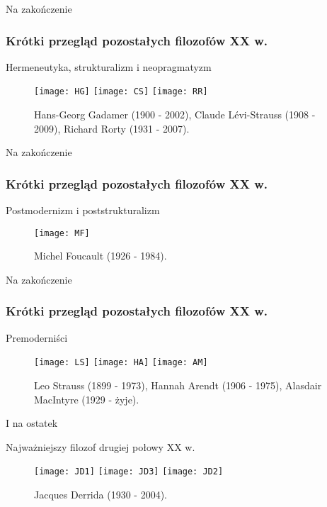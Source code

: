 \begin{frame}{Na zakończenie}
\frametitle{Krótki przegląd pozostałych filozofów XX w.}
\begin{block}{Hermeneutyka, strukturalizm i neopragmatyzm}
\begin{figure}
\centering
\texttt{[image: HG]}
\texttt{[image: CS]}
\texttt{[image: RR]}
\caption{Hans-Georg Gadamer (1900 - 2002), Claude Lévi-Strauss (1908 - 2009), Richard Rorty (1931 - 2007).}
\end{figure}
\end{block}
\end{frame}

\begin{frame}{Na zakończenie}
\frametitle{Krótki przegląd pozostałych filozofów XX w.}
\begin{block}{Postmodernizm i poststrukturalizm}
\begin{figure}
\centering
\texttt{[image: MF]}
\caption{Michel Foucault (1926 - 1984).}
\end{figure}
\end{block}
\end{frame}

\begin{frame}{Na zakończenie}
\frametitle{Krótki przegląd pozostałych filozofów XX w.}
\begin{block}{Premoderniści}
\begin{figure}
\centering
\texttt{[image: LS]}
\texttt{[image: HA]}
\texttt{[image: AM]}
\caption{Leo Strauss (1899 - 1973), Hannah Arendt (1906 - 1975), Alasdair MacIntyre (1929 - żyje).}
\end{figure}
\end{block}
\end{frame}

\begin{frame}{I na ostatek}
\begin{block}{Najważniejszy filozof drugiej połowy XX w.}
\pause
\begin{figure}
\centering
\texttt{[image: JD1]}
\texttt{[image: JD3]}
\texttt{[image: JD2]}
\caption{Jacques Derrida (1930 - 2004).}
\end{figure}
\end{block}
\end{frame}

